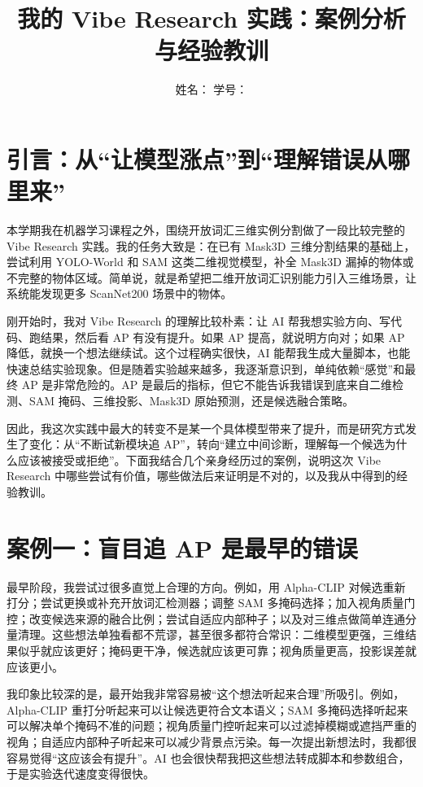 \documentclass[UTF8,a4paper,12pt]{ctexart}
\title{我的 Vibe Research 实践：案例分析与经验教训}
\author{姓名：\underline{\hspace{4cm}} \quad 学号：\underline{\hspace{4cm}}}
\date{}
\begin{document}
\maketitle

\section{引言：从“让模型涨点”到“理解错误从哪里来”}

本学期我在机器学习课程之外，围绕开放词汇三维实例分割做了一段比较完整的 Vibe Research 实践。我的任务大致是：在已有 Mask3D 三维分割结果的基础上，尝试利用 YOLO-World 和 SAM 这类二维视觉模型，补全 Mask3D 漏掉的物体或不完整的物体区域。简单说，就是希望把二维开放词汇识别能力引入三维场景，让系统能发现更多 ScanNet200 场景中的物体。

刚开始时，我对 Vibe Research 的理解比较朴素：让 AI 帮我想实验方向、写代码、跑结果，然后看 AP 有没有提升。如果 AP 提高，就说明方向对；如果 AP 降低，就换一个想法继续试。这个过程确实很快，AI 能帮我生成大量脚本，也能快速总结实验现象。但是随着实验越来越多，我逐渐意识到，单纯依赖“感觉”和最终 AP 是非常危险的。AP 是最后的指标，但它不能告诉我错误到底来自二维检测、SAM 掩码、三维投影、Mask3D 原始预测，还是候选融合策略。

因此，我这次实践中最大的转变不是某一个具体模型带来了提升，而是研究方式发生了变化：从“不断试新模块追 AP”，转向“建立中间诊断，理解每一个候选为什么应该被接受或拒绝”。下面我结合几个亲身经历过的案例，说明这次 Vibe Research 中哪些尝试有价值，哪些做法后来证明是不对的，以及我从中得到的经验教训。

\section{案例一：盲目追 AP 是最早的错误}

最早阶段，我尝试过很多直觉上合理的方向。例如，用 Alpha-CLIP 对候选重新打分；尝试更换或补充开放词汇检测器；调整 SAM 多掩码选择；加入视角质量门控；改变候选来源的融合比例；尝试自适应内部种子；以及对三维点做简单连通分量清理。这些想法单独看都不荒谬，甚至很多都符合常识：二维模型更强，三维结果似乎就应该更好；掩码更干净，候选就应该更可靠；视角质量更高，投影误差就应该更小。

我印象比较深的是，最开始我非常容易被“这个想法听起来合理”所吸引。例如，Alpha-CLIP 重打分听起来可以让候选更符合文本语义；SAM 多掩码选择听起来可以解决单个掩码不准的问题；视角质量门控听起来可以过滤掉模糊或遮挡严重的视角；自适应内部种子听起来可以减少背景点污染。每一次提出新想法时，我都很容易觉得“这应该会有提升”。AI 也会很快帮我把这些想法转成脚本和参数组合，于是实验迭代速度变得很快。
\end{document}
